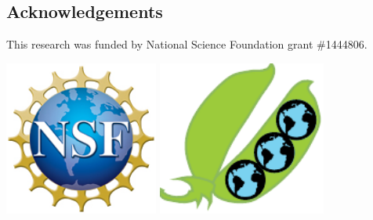 \documentclass[]{pagposter}
\begin{document}
\begin{multicols*}{3}

  \section*{Acknowledgements}
  
  \noindent This research was funded by National Science Foundation grant \#1444806.

  \begin{center}
    \includegraphics[height=2in]{nsf1.jpg} %
    \hspace{1in}
    \includegraphics[height=2in]{LegFedSiteLogo.pdf} %
  \end{center}
  
  
\end{multicols*}
\end{document}
